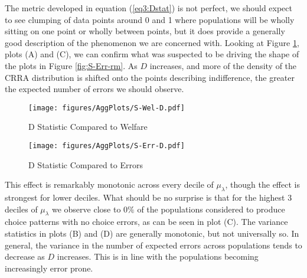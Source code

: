 \documentclass[../main.tex]{subfiles}
\begin{document}
The metric developed in equation (\ref{eq3:Dstat}) is not perfect, we should expect to see clumping of data points around 0 and 1 where populations will be wholly sitting on one point or wholly between points, but it does provide a generally good description of the phenomenon we are concerned with.
Looking at Figure \ref{fig:D-Wel-smooth}, plots (A) and (C), we can confirm what was suspected to be driving the shape of the plots in Figure \ref{fig:S-Err-rm}.
As $D$ increases, and more of the density of the CRRA distribution is shifted onto the points describing indifference, the greater the expected number of errors we should observe.

\begin{figure}[h!]
	\center
	\caption{D Statistic Compared to Welfare}
	\texttt{[image: figures/AggPlots/S-Wel-D.pdf]}
	\label{fig:D-Wel-smooth}
\end{figure}

\begin{figure}[h!]
	\center
	\caption{D Statistic Compared to Errors}
	\texttt{[image: figures/AggPlots/S-Err-D.pdf]}
	\label{fig:D-Err-smooth}
\end{figure}

This effect is remarkably monotonic across every decile of $\mu_\lambda$, though the effect is strongest for lower deciles.
What should be no surprise is that for the highest 3 deciles of $\mu_\lambda$ we observe close to $0\%$ of the populations considered to produce choice patterns with no choice errors, as can be seen in plot (C).
The variance statistics in plots (B) and (D) are generally monotonic, but not universally so.
In general, the variance in the number of expected errors across populations tends to decrease as $D$ increases.
This is in line with the populations becoming increasingly error prone.
\end{document}
